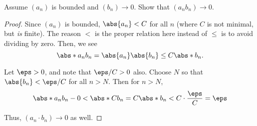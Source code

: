   \item Assume $(a_{n})$ is bounded and $(b_{n}) \to 0$. Show that $(a_{n}b_{n}) \to 0$.
        \begin{proof}
          Since $(a_{n})$ is bounded, $\abs{a_{n}} < C$ for all $n$ (where $C$ is not minimal, but \textit{is} finite).
          The reason $<$ is the proper relation here instead of $\le$ is to avoid dividing by zero.
          Then, we see
          \[
            \abs*{a_{n}b_{n}} = \abs{a_{n}}\abs{b_{n}} \le C\abs*{b_{n}}.
          \]

          Let $\eps > 0$, and note that $\eps/C > 0$ also. Choose $N$ so that $\abs{b_{n}} < \eps/C$ for all $n > N$.
          Then for $n > N$,
          \[
            \abs*{a_{n}b_{n} - 0} < \abs*{Cb_{n}} = C\abs*{b_{n}} < C \cdot \frac{\eps}{C} = \eps
          \]

          Thus, $(a_{n} \cdot b_{n}) \to 0$ as well.
        \end{proof}
